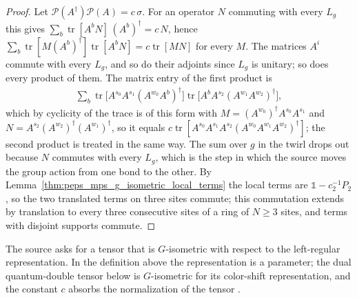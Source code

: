 \begin{proof}\leanok
    Let $\mathcal{P}(A^{\dagger})\mathcal{P}(A)=c\,\sigma$. For an operator $N$
    commuting with every $L_{g}$ this gives
    $\sum_{b}\operatorname{tr}[A^{b}N]\,(A^{b})^{\dagger}=c\,N$, hence
    $\sum_{b}\operatorname{tr}[M(A^{b})^{\dagger}]\operatorname{tr}[A^{b}N]
        =c\operatorname{tr}[MN]$ for every $M$. The matrices $A^{i}$ commute with
    every $L_{g}$, and so do their adjoints since $L_{g}$ is unitary; so does
    every product of them. The matrix entry of the first product is
    \begin{align}
        \sum_{b}\operatorname{tr}\bigl[A^{s_{0}}A^{s_{1}}(A^{w_{0}}A^{b})^{\dagger}\bigr]
        \operatorname{tr}\bigl[A^{b}A^{s_{2}}(A^{w_{1}}A^{w_{2}})^{\dagger}\bigr],
        \label{eq:peps_mps_g_isometric_three_site_entry}
    \end{align}
    which by cyclicity of the trace is of this form with
    $M=(A^{w_{0}})^{\dagger}A^{s_{0}}A^{s_{1}}$ and
    $N=A^{s_{2}}(A^{w_{2}})^{\dagger}(A^{w_{1}})^{\dagger}$, so it equals
    $c\operatorname{tr}[A^{s_{0}}A^{s_{1}}A^{s_{2}}
            (A^{w_{0}}A^{w_{1}}A^{w_{2}})^{\dagger}]$; the second product is treated
    in the same way. The sum over $g$ in the twirl drops out because $N$
    commutes with every $L_{g}$, which is the step in which the source moves the
    group action from one bond to the other. By
    Lemma~\ref{thm:peps_mps_g_isometric_local_terms} the local terms are
    $\mathbb{1}-c_{2}^{-1}P_{2}$, so the two translated terms on three sites
    commute; this commutation extends by translation to every three consecutive sites of a
    ring of $N\geq 3$ sites, and terms with disjoint supports commute.
\end{proof}

The source asks for a tensor that is $G$-isometric with respect to the
left-regular representation. In the definition above the representation is a
parameter; the dual quantum-double tensor below is $G$-isometric for its
color-shift representation, and the constant $c$ absorbs the
normalization of the tensor \cite{gap:rmp_peps_quantum_double_g_isometry}.


